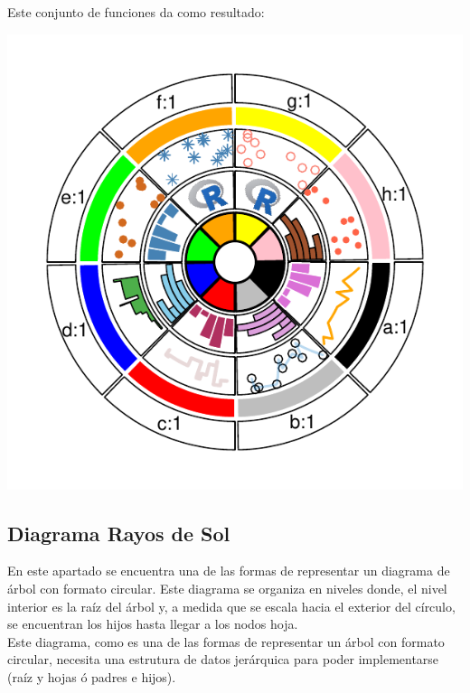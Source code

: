 \documentclass{article}\usepackage[]{graphicx}\usepackage[]{color}
\makeatletter
\def\maxwidth{ %
  \ifdim\Gin@nat@width>\linewidth
    \linewidth
  \else
    \Gin@nat@width
  \fi
}
\newenvironment{knitrout}{}{} %
\makeatother
\begin{document}
Este conjunto de funciones da como resultado: 
\begin{knitrout}
\color{fgcolor}

{\centering \includegraphics[width=\maxwidth]{figure/cuadri_circle-1} 

}



\end{knitrout}
\clearpage
\subsection{Diagrama Rayos de Sol}\label{ssec:rayosSol}
En este apartado se encuentra una de las formas de representar un diagrama de \'arbol con formato circular. Este diagrama se organiza en niveles donde, el nivel interior es la ra\'iz del \'arbol y, a medida que se escala hacia el exterior del c\'irculo, se encuentran los hijos hasta llegar a los nodos hoja.~\\
Este diagrama, como es una de las formas de representar un \'arbol con formato circular, necesita una estrutura de datos jer\'arquica para poder implementarse (ra\'iz y hojas \'o padres e hijos).
\end{document}
